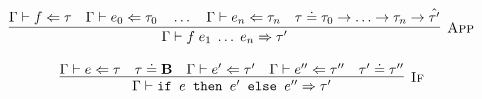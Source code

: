 \begin{equation*}
\infer[\textsc{App}]
	{\Gamma \vdash f\;e_1\;\ldots\;e_n \Rightarrow \tau'}
	{\Gamma \vdash f \Leftarrow \tau
	\quad\Gamma \vdash e_0 \Leftarrow \tau_0
	\quad\ldots
	\quad\Gamma\vdash e_n \Leftarrow \tau_n
	\quad\tau \doteq \tau_0 \rightarrow \ldots \rightarrow \tau_n \rightarrow \hat{\tau'}}
\end{equation*}

\begin{equation*}
\infer[\textsc{If}]
	{\Gamma \vdash \texttt{if } e \texttt{ then } e' \texttt{ else } e'' \Rightarrow \tau'}
	{\Gamma \vdash e \Leftarrow \tau
	\quad \tau \doteq \textbf{B}
	\quad \Gamma \vdash e' \Leftarrow \tau'
	\quad \Gamma \vdash e'' \Leftarrow \tau''
	\quad \tau' \doteq \tau''}
\end{equation*}
